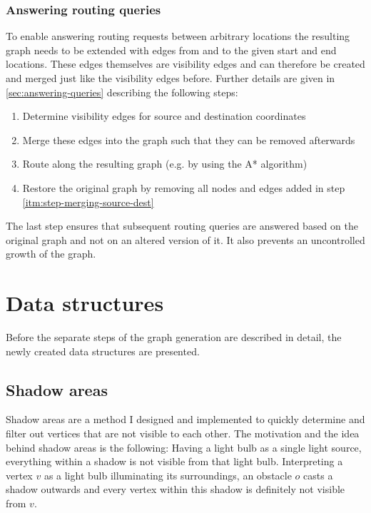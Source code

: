 		\subsubsection{Answering routing queries}
		
			To enable answering routing requests between arbitrary locations the resulting graph needs to be extended with edges from and to the given start and end locations.
			These edges themselves are visibility edges and can therefore be created and merged just like the visibility edges before.
			Further details are given in \cref{sec:answering-queries} describing the following steps:
			\begin{enumerate}
				\item Determine visibility edges for source and destination coordinates\label{itm:step-merging-source-dest}
				\item Merge these edges into the graph such that they can be removed afterwards
				\item Route along the resulting graph (e.g. by using the A* algorithm)
				\item Restore the original graph by removing all nodes and edges added in step \ref{itm:step-merging-source-dest}
			\end{enumerate}
			The last step ensures that subsequent routing queries are answered based on the original graph and not on an altered version of it.
			It also prevents an uncontrolled growth of the graph.
	
\section{Data structures}
	
	Before the separate steps of the graph generation are described in detail, the newly created data structures are presented.
		
	\subsection{Shadow areas}
	\label{subsec:shadow-areas}
		
		Shadow areas are a method I designed and implemented to quickly determine and filter out vertices that are not visible to each other.
		The motivation and the idea behind shadow areas is the following:
		Having a light bulb as a single light source, everything within a shadow is not visible from that light bulb.
		Interpreting a vertex $v$ as a light bulb illuminating its surroundings, an obstacle $o$ casts a shadow outwards and every vertex within this shadow is definitely not visible from $v$.
		
